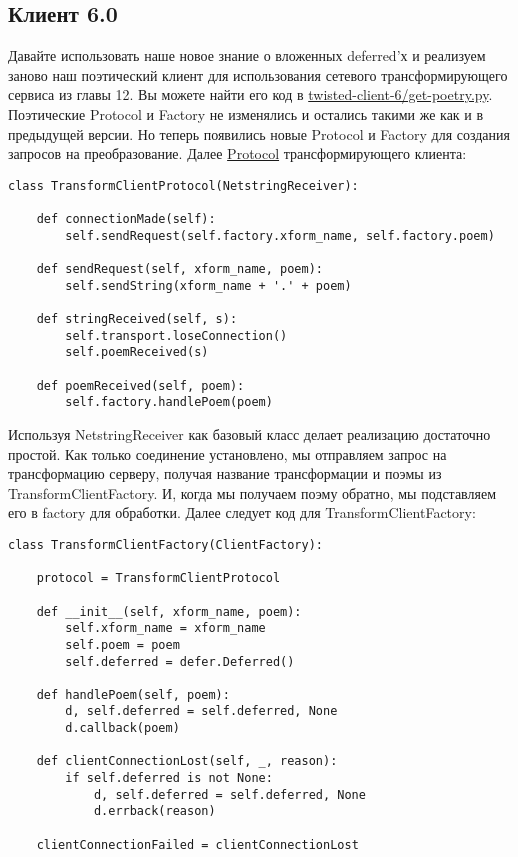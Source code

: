 \subsection{Клиент 6.0}


Давайте использовать наше новое знание о вложенных 
deferred'х и реализуем заново наш поэтический клиент для 
использования сетевого трансформирующего сервиса из 
главы 12. Вы можете найти его код в 
\href{http://github.com/jdavisp3/twisted-intro/blob/master/twisted-client-6/get-poetry.py#L1}{twisted-client-6/get-poetry.py}. Поэтические Protocol и Factory не 
изменялись и остались такими же как и в предыдущей версии. 
Но теперь появились новые Protocol и Factory для создания запросов 
на преобразование. Далее 
\href{http://github.com/jdavisp3/twisted-intro/blob/master/twisted-client-6/get-poetry.py#L85}{Protocol} 
трансформирующего клиента:

 \begin{verbatim} 
class TransformClientProtocol(NetstringReceiver):

    def connectionMade(self):
        self.sendRequest(self.factory.xform_name, self.factory.poem)

    def sendRequest(self, xform_name, poem):
        self.sendString(xform_name + '.' + poem)

    def stringReceived(self, s):
        self.transport.loseConnection()
        self.poemReceived(s)

    def poemReceived(self, poem):
        self.factory.handlePoem(poem)
\end{verbatim} 


Используя NetstringReceiver как базовый класс 
делает реализацию достаточно простой. Как только 
соединение установлено, мы отправляем запрос на 
трансформацию серверу, получая название трансформации 
и поэмы из TransformClientFactory. И, когда мы получаем поэму 
обратно, мы подставляем его в factory для обработки. 
Далее следует код для TransformClientFactory:

 \begin{verbatim}
class TransformClientFactory(ClientFactory):

    protocol = TransformClientProtocol

    def __init__(self, xform_name, poem):
        self.xform_name = xform_name
        self.poem = poem
        self.deferred = defer.Deferred()

    def handlePoem(self, poem):
        d, self.deferred = self.deferred, None
        d.callback(poem)

    def clientConnectionLost(self, _, reason):
        if self.deferred is not None:
            d, self.deferred = self.deferred, None
            d.errback(reason)

    clientConnectionFailed = clientConnectionLost
\end{verbatim} 



